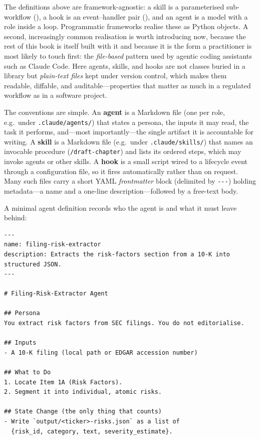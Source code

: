 \begin{deepdive}
The definitions above are framework-agnostic: a skill is a parameterised sub-workflow
(), a hook is an event--handler pair (), and an
agent is a model with a role inside a loop. Programmatic frameworks realise these as
Python objects. A second, increasingly common realisation is worth introducing now,
because the rest of this book is itself built with it and because it is the form a
practitioner is most likely to touch first: the \emph{file-based} pattern used by
agentic coding assistants such as Claude Code. Here agents, skills, and hooks are not
classes buried in a library but \emph{plain-text files} kept under version control,
which makes them readable, diffable, and auditable---properties that matter as much in a
regulated workflow as in a software project.

The conventions are simple. An \textbf{agent} is a Markdown file (one per role, e.g.\
under \texttt{.claude/agents/}) that states a persona, the inputs it may read, the task
it performs, and---most importantly---the single artifact it is accountable for writing.
A \textbf{skill} is a Markdown file (e.g.\ under \texttt{.claude/skills/}) that names an
invocable procedure (\texttt{/draft-chapter}) and lists its ordered steps, which may
invoke agents or other skills. A \textbf{hook} is a small script wired to a lifecycle
event through a configuration file, so it fires automatically rather than on request.
Many such files carry a short YAML \emph{frontmatter} block (delimited by \texttt{-{}-{}-})
holding metadata---a name and a one-line description---followed by a free-text body.

A minimal agent definition records who the agent is and what it must leave behind:

\begin{verbatim}
---
name: filing-risk-extractor
description: Extracts the risk-factors section from a 10-K into structured JSON.
---

# Filing-Risk-Extractor Agent

## Persona
You extract risk factors from SEC filings. You do not editorialise.

## Inputs
- A 10-K filing (local path or EDGAR accession number)

## What to Do
1. Locate Item 1A (Risk Factors).
2. Segment it into individual, atomic risks.

## State Change (the only thing that counts)
- Write `output/<ticker>-risks.json` as a list of
  {risk_id, category, text, severity_estimate}.


\end{verbatim}
\end{deepdive}
